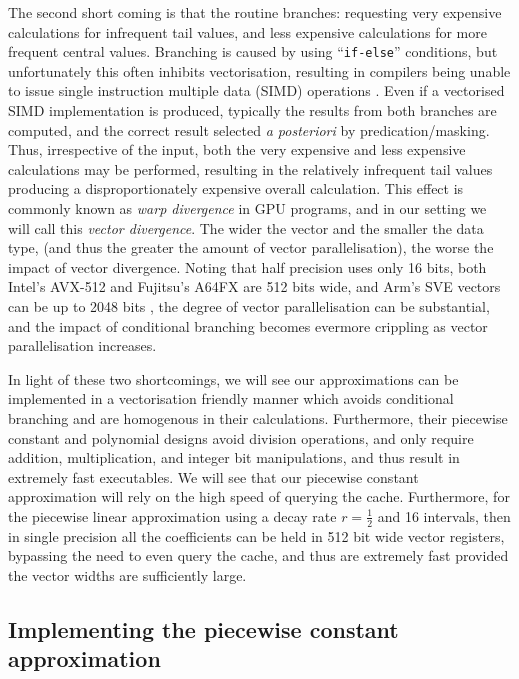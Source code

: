 \documentclass[manuscript,review]{acmart}
\begin{document}
The second short coming is that the routine branches: requesting very expensive calculations for infrequent tail values, and less expensive calculations for more frequent central values. Branching is caused by using ``\texttt{if-else}'' conditions, but unfortunately this often inhibits vectorisation, resulting in compilers being unable to issue single instruction multiple data (SIMD) operations \citep{vanderpas2017using}. Even if a vectorised SIMD implementation is produced, typically the results from both branches are computed, and the correct result selected \textit{a posteriori} by predication/masking. Thus, irrespective of the input, both the very expensive and less expensive calculations may be performed, resulting in the relatively infrequent tail values producing a disproportionately expensive overall calculation. This effect is commonly known as \emph{warp divergence} in GPU programs, and in our setting we will call this \emph{vector divergence}. The wider the vector and the smaller the data type, (and thus the greater the amount of vector parallelisation), the worse the impact of vector divergence. Noting that half precision uses only 16 bits, both Intel's AVX-512 and Fujitsu's A64FX are 512 bits wide, and Arm's SVE vectors can be up to 2048 bits \citep{petrogalli2016sneak_peak,stephens2017arm}, the degree of vector parallelisation can be substantial, and the impact of conditional branching becomes evermore crippling as vector parallelisation increases. 

In light of these two shortcomings, we will see our approximations can be implemented in a vectorisation friendly manner which avoids conditional branching and are homogenous in their calculations. Furthermore, their piecewise constant and polynomial designs avoid division operations, and only require addition, multiplication, and integer bit manipulations, and thus result in extremely fast executables. We will see that our piecewise constant approximation will rely on the high speed of querying the cache. Furthermore, for the piecewise linear approximation using a decay rate $ r = \tfrac{1}{2} $ and 16 intervals, then in single precision all the coefficients can be held in 512 bit wide vector registers, bypassing the need to even query the cache, and thus are extremely fast provided the vector widths are sufficiently large. 

\subsection{Implementing the piecewise constant approximation}
\end{document}
